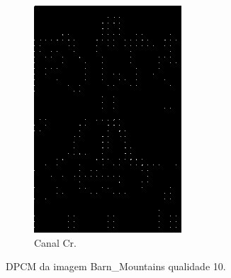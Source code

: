 \documentclass[a4paper, 12pt]{article}
\begin{document}
\begin{figure}[H]
\begin{subfigure}{0.3\textwidth}
                \includegraphics[scale=0.5]{resources/DPCM/CR_DPCM10.png} 
                \caption{ Canal Cr.}
            \end{subfigure}
            \caption{\label{fig:my_label} DPCM da imagem Barn\_Mountains qualidade 10.}
        \end{figure}
\end{document}
